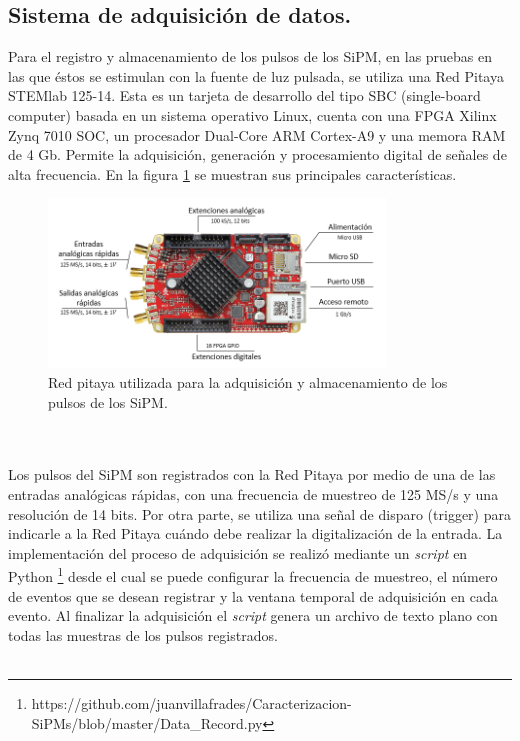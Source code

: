\subsection{Sistema de adquisición de datos.}
Para el registro y almacenamiento de los pulsos de los SiPM, en las pruebas en las que éstos se estimulan con la fuente de luz pulsada, se utiliza una Red Pitaya STEMlab 125-14. Esta es un tarjeta de desarrollo del tipo SBC (single-board computer) basada en un sistema operativo Linux, cuenta con una FPGA Xilinx Zynq 7010 SOC, un procesador Dual-Core ARM Cortex-A9 y una memora RAM de 4 Gb. Permite la adquisición, generación y procesamiento digital de señales de alta frecuencia. En la figura \ref{fig:Red_pitaya} se muestran sus principales características.   
\begin{figure}[h!]
\begin{centering}
  \includegraphics[width=0.8\textwidth]{Images/Red_pitaya.PNG}
    \caption{Red pitaya utilizada para la adquisición y almacenamiento de los  pulsos de los SiPM.}
    \label{fig:Red_pitaya}
  \par\end{centering}
\end{figure}
\\ \\
Los pulsos del SiPM son registrados con la Red Pitaya por medio de una de las entradas analógicas rápidas, con una frecuencia de muestreo de 125 MS/s y una resolución de 14 bits. Por otra parte, se utiliza una señal de disparo (trigger) para indicarle a la Red Pitaya cuándo debe realizar la digitalización de la entrada. La implementación del proceso de adquisición se realizó mediante un \textit{script} en Python \footnote{https://github.com/juanvillafrades/Caracterizacion-SiPMs/blob/master/Data\_Record.py} %
desde el cual se puede configurar la frecuencia de muestreo, el número de eventos  que se desean registrar y la ventana temporal de adquisición en cada evento. Al finalizar la adquisición el \textit{script} genera un archivo de texto plano con todas las muestras de los pulsos registrados.\\ \\
